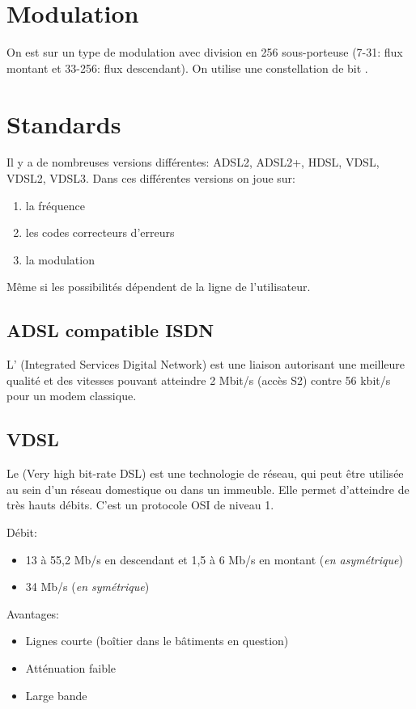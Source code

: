 \section{Modulation}

On est sur un type de modulation avec division en 256 sous-porteuse (7-31: flux montant et 33-256: flux descendant). On utilise une constellation de bit .

\section{Standards}

Il y a de nombreuses versions différentes: ADSL2, ADSL2+, HDSL, VDSL, VDSL2, VDSL3. Dans ces différentes versions on joue sur:
\begin{enumerate}
\item la fréquence
\item les codes correcteurs d'erreurs
\item la modulation
\end{enumerate}
Même si les possibilités dépendent de la ligne de l'utilisateur.

\subsection{ADSL compatible ISDN}

L' (Integrated Services Digital Network) est une liaison autorisant une meilleure qualité et des vitesses pouvant atteindre 2 Mbit/s (accès S2) contre 56 kbit/s pour un modem classique.

\subsection{VDSL}

Le  (Very high bit-rate DSL) est une technologie de réseau, qui peut être utilisée au sein d'un réseau domestique ou dans un immeuble. Elle permet d'atteindre de très hauts débits. C'est un protocole OSI de niveau 1.

Débit:
\begin{itemize}
\item 13 à 55,2 Mb/s en descendant et 1,5 à 6 Mb/s en montant (\textit{en asymétrique})
\item 34 Mb/s (\textit{en symétrique})
\end{itemize}

Avantages:
\begin{itemize}
\item Lignes courte (boîtier dans le bâtiments en question)
\item Atténuation faible
\item Large bande
\end{itemize}
